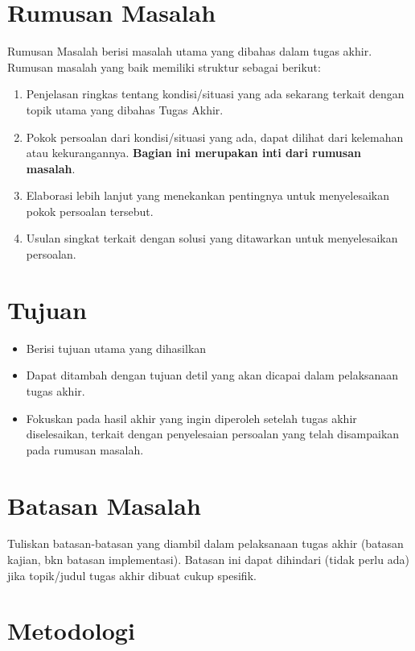 \section{Rumusan Masalah}

Rumusan Masalah berisi masalah utama yang dibahas dalam tugas akhir. Rumusan
masalah yang baik memiliki struktur sebagai berikut:

\begin{enumerate}
	\item Penjelasan ringkas tentang kondisi/situasi yang ada sekarang terkait
	      dengan topik utama yang dibahas Tugas Akhir.
	\item Pokok persoalan dari kondisi/situasi yang ada, dapat dilihat dari
	      kelemahan atau kekurangannya. \textbf{Bagian ini merupakan inti dari rumusan
		      masalah}.
	\item Elaborasi lebih lanjut yang menekankan pentingnya untuk menyelesaikan
	      pokok persoalan tersebut.
	\item Usulan singkat terkait dengan solusi yang ditawarkan untuk
	      menyelesaikan persoalan.
\end{enumerate}

\section{Tujuan}

\begin{itemize}
	\item Berisi tujuan utama yang dihasilkan
	\item Dapat ditambah dengan tujuan detil yang akan dicapai dalam pelaksanaan
	      tugas akhir.
	\item Fokuskan pada hasil akhir yang ingin diperoleh setelah tugas akhir
	      diselesaikan, terkait dengan penyelesaian persoalan yang telah disampaikan
	      pada rumusan masalah.
\end{itemize}

\section{Batasan Masalah}

Tuliskan batasan-batasan yang diambil dalam pelaksanaan tugas akhir (batasan
kajian, bkn batasan implementasi). Batasan ini dapat dihindari (tidak perlu ada)
jika topik/judul tugas akhir dibuat cukup spesifik.

\section{Metodologi}

